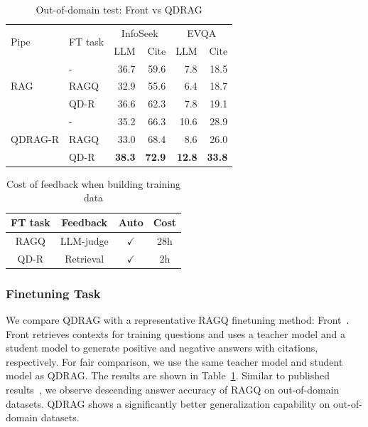 \documentclass[letterpaper]{article} %
\begin{document}
\begin{table}[t]
    
    \centering
\begin{tabular}{@{}llrrrr@{}}
\toprule
\multirow{2}{*}{Pipe} & \multirow{2}{*}{FT task} & \multicolumn{2}{c}{InfoSeek} & \multicolumn{2}{c}{EVQA} \\
& & LLM & Cite & LLM & Cite \\ \midrule
\multirow{3}{*}{RAG} & - & 36.7 & 59.6& 7.8& 18.5\\
 & RAGQ & 32.9 & 55.6& 6.4& 18.7\\
 & QD-R & 36.6& 62.3& 7.8& 19.1\\ \midrule
\multirow{3}{*}{QDRAG-R} & - & 35.2& 66.3& 10.6& 28.9\\
 & RAGQ & 33.0& 68.4& 8.6& 26.0\\
 & QD-R & \textbf{38.3}& \textbf{72.9}& \textbf{12.8}& \textbf{33.8}\\ 
\bottomrule
\end{tabular}
\caption{Out-of-domain test: Front vs QDRAG}
    \label{tab:dpo_task}
\end{table}

\begin{table}[t]
    \centering
    \setlength{\tabcolsep}{7.6pt}
\begin{tabular}{@{}cccc@{}}
\toprule
FT task & Feedback & Auto & Cost \\ \midrule
RAGQ & LLM-judge & $\checkmark$ & 28h\\ 
QD-R & Retrieval & $\checkmark$ & 2h\\
\bottomrule
\end{tabular}
\caption{Cost of feedback when building training data}
    \label{tab:feedback_cost}
    \vspace*{-2mm}
\end{table}


\subsubsection{Finetuning Task}

We compare QDRAG with a representative RAGQ finetuning method: Front~\cite{huang-etal-2024-learning}. Front retrieves contexts for training questions and uses a teacher model and a student model to generate positive and negative answers with citations, respectively. For fair comparison, we use the same teacher model and student model as QDRAG. The results are shown in Table~\ref{tab:dpo_task}. Similar to published results~\cite{huang-etal-2024-learning,song2025measuring}, we observe descending answer accuracy of RAGQ on out-of-domain datasets. QDRAG shows a significantly better generalization capability on out-of-domain datasets.
\end{document}
